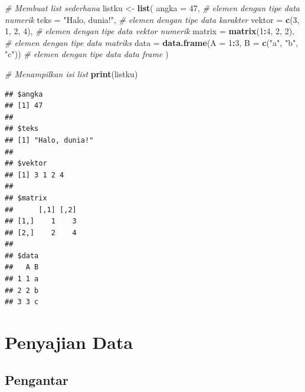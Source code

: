 \documentclass[
]{book}
\newenvironment{Shaded}{\begin{snugshade}}{\end{snugshade}}
\newcommand{\AttributeTok}[1]{\textcolor[rgb]{0.13,0.29,0.53}{#1}}
\newcommand{\CommentTok}[1]{\textcolor[rgb]{0.56,0.35,0.01}{\textit{#1}}}
\newcommand{\DecValTok}[1]{\textcolor[rgb]{0.00,0.00,0.81}{#1}}
\newcommand{\FunctionTok}[1]{\textcolor[rgb]{0.13,0.29,0.53}{\textbf{#1}}}
\newcommand{\NormalTok}[1]{#1}
\newcommand{\OtherTok}[1]{\textcolor[rgb]{0.56,0.35,0.01}{#1}}
\newcommand{\SpecialCharTok}[1]{\textcolor[rgb]{0.81,0.36,0.00}{\textbf{#1}}}
\newcommand{\StringTok}[1]{\textcolor[rgb]{0.31,0.60,0.02}{#1}}
\theoremstyle{definition}
\theoremstyle{definition}
\theoremstyle{definition}
\theoremstyle{definition}
\theoremstyle{remark}
\begin{document}
\begin{Shaded}
\begin{Highlighting}[]
\CommentTok{\# Membuat list sederhana}
\NormalTok{listku }\OtherTok{\textless{}{-}} \FunctionTok{list}\NormalTok{(}
  \AttributeTok{angka =} \DecValTok{47}\NormalTok{,                   }\CommentTok{\# elemen dengan tipe data numerik}
  \AttributeTok{teks =} \StringTok{"Halo, dunia!"}\NormalTok{,        }\CommentTok{\# elemen dengan tipe data karakter}
  \AttributeTok{vektor =} \FunctionTok{c}\NormalTok{(}\DecValTok{3}\NormalTok{, }\DecValTok{1}\NormalTok{, }\DecValTok{2}\NormalTok{, }\DecValTok{4}\NormalTok{),       }\CommentTok{\# elemen dengan tipe data vektor numerik}
  \AttributeTok{matrix =} \FunctionTok{matrix}\NormalTok{(}\DecValTok{1}\SpecialCharTok{:}\DecValTok{4}\NormalTok{, }\DecValTok{2}\NormalTok{, }\DecValTok{2}\NormalTok{),   }\CommentTok{\# elemen dengan tipe data matriks}
  \AttributeTok{data =} \FunctionTok{data.frame}\NormalTok{(}\AttributeTok{A =} \DecValTok{1}\SpecialCharTok{:}\DecValTok{3}\NormalTok{, }\AttributeTok{B =} \FunctionTok{c}\NormalTok{(}\StringTok{"a"}\NormalTok{, }\StringTok{"b"}\NormalTok{, }\StringTok{"c"}\NormalTok{))  }\CommentTok{\# elemen dengan tipe data data frame}
\NormalTok{)}

\CommentTok{\# Menampilkan isi list}
\FunctionTok{print}\NormalTok{(listku)}
\end{Highlighting}
\end{Shaded}

\begin{verbatim}
## $angka
## [1] 47
## 
## $teks
## [1] "Halo, dunia!"
## 
## $vektor
## [1] 3 1 2 4
## 
## $matrix
##      [,1] [,2]
## [1,]    1    3
## [2,]    2    4
## 
## $data
##   A B
## 1 1 a
## 2 2 b
## 3 3 c
\end{verbatim}

\hypertarget{penyajian-data}{%
\chapter{Penyajian Data}\label{penyajian-data}}

\hypertarget{pengantar}{%
\section{Pengantar}\label{pengantar}}
\end{document}

